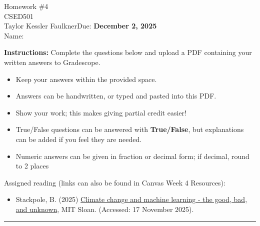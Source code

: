 \documentclass[11pt]{article}
\newcommand{\Class}{CSED501}
\newcommand{\Instructor}{Taylor Kessler Faulkner}
\newcommand{\DueDate}{Due: \textbf{December 2, 2025}}
\newcommand{\HomeworkTitle}{Homework \#4}
\newcommand{\StudentName}{\underline{\hspace{5cm}} }
\begin{document}
\begin{center}
  {\LARGE \HomeworkTitle} \\
  \vspace{6pt}
  {\large \Class} \\
  \vspace{4pt}
  \Instructor \hfill \DueDate \\
  \vspace{8pt}
  Name: \StudentName
\end{center}

\textbf{Instructions:}
Complete the questions below and upload a PDF containing your written answers to Gradescope. 
\begin{itemize}
    \item Keep your answers within the provided space.
    \item Answers can be handwritten, or typed and pasted into this PDF. 
    \item Show your work; this makes giving partial credit easier!
    \item True/False questions can be answered with \textbf{True/False}, but explanations can be added if you feel they are needed.
    \item Numeric answers can be given in fraction or decimal form; if decimal, round to 2 places
\end{itemize}

Assigned reading (links can also be found in Canvas Week 4 Resources):
\begin{itemize}

\item Stackpole, B. (2025) \href{https://mitsloan.mit.edu/ideas-made-to-matter/climate-change-and-machine-learning-good-bad-and-unknown}{Climate change and machine learning - the good, bad, and unknown}, MIT Sloan. (Accessed: 17 November 2025). 
\end{itemize}


\vspace{12pt}
\hrule
\vspace{12pt}

\newpage

\end{document}
